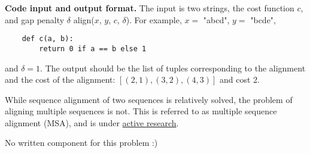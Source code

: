 \documentclass{hw_template}
\newcommand{\io}{\textbf{Code input and output format.} }
\begin{document}
\begin{challenge}
    
    \io The input is two strings, the cost function $c$, and gap penalty $\delta$
    align($x$, $y$, $c$, $\delta$).
    For example, $x = $ "abcd", $y=$ "bcde",
    \begin{verbatim}
    def c(a, b):
        return 0 if a == b else 1
    \end{verbatim}
    and $\delta = 1$.
    The output should be the list of tuples corresponding to the alignment and the cost of the alignment:
    $[(2,1), (3,2), (4,3)]$ and cost 2.
    
    
    While sequence alignment of two sequences is relatively solved,
    the problem of aligning multiple sequences is not.
    This is referred to as multiple sequence alignment (MSA),
    and is under \href{https://academic.oup.com/bioinformatics/article/39/1/btac724/6820925}{active research}.
\end{challenge}

\begin{solution}
No written component for this problem :)
\end{solution}
\end{document}
